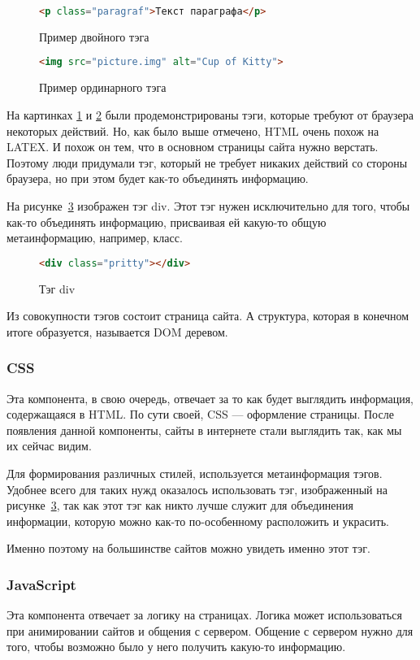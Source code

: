 \begin{figure}
    \begin{lstlisting}[language=html]
        <p class="paragraf">Текст параграфа</p>
    \end{lstlisting}
    \caption{Пример двойного тэга}
    \label{html-tag-2}
\end{figure}
\begin{figure}
    \begin{lstlisting}[language=html]
        <img src="picture.img" alt="Cup of Kitty">
    \end{lstlisting}
    \caption{Пример ординарного тэга}
    \label{html-tag-1}
\end{figure}

На картинках \ref{html-tag-2} и \ref{html-tag-1} были продемонстрированы тэги, которые требуют от браузера некоторых действий.
Но, как было выше отмечено, HTML очень похож на LATEX. И похож он тем, что в основном страницы сайта нужно верстать. 
Поэтому люди придумали тэг, который не требует никаких действий со стороны браузера, но при этом будет как-то объединять информацию.

На рисунке~\ref{html-div} изображен тэг div. Этот тэг нужен исключительно для того, чтобы как-то объединять информацию, присваивая ей какую-то общую метаинформацию, например, класс.

\begin{figure}
	\begin{lstlisting}[language=html]
	<div class="pritty"></div>
	\end{lstlisting}
	\caption{Тэг div}
	\label{html-div}
\end{figure}

Из совокупности тэгов состоит страница сайта. А структура, которая в конечном итоге образуется, называется DOM деревом.

\subsubsection{CSS}
Эта компонента, в свою очередь, отвечает за то как будет выглядить информация, содержащаяся в HTML. По сути своей, CSS --- оформление страницы.
После появления данной компоненты, сайты в интернете стали выглядить так, как мы их сейчас видим.

Для формирования различных стилей, используется метаинформация тэгов. 
Удобнее всего для таких нужд оказалось использовать тэг, изображенный на рисунке~\ref{html-div}, так как этот тэг как никто лучше служит для объединения информации, которую можно как-то по-особенному
расположить и украсить.

Именно поэтому на большинстве сайтов можно увидеть именно этот тэг.

\subsubsection{JavaScript} \label{js-ref}
Эта компонента отвечает за логику на страницах. Логика может использоваться при анимировании сайтов и общения с сервером. Общение с сервером нужно для того, чтобы возможно было у него получить какую-то информацию.


 
